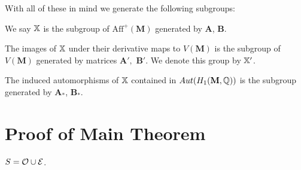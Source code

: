 \documentclass[]{article}
\def\bM{\mathbf{M}}
\begin{document}
With all of these in mind we generate the following subgroups:

\begin{Def}
We say $\mathbb{X}$ is the subgroup of $\text{Aff}^+(\bM)$ generated by $\mathbf{A}$, $\mathbf{B}$.
\end{Def}

\begin{Def}
The images of $\mathbb{X}$ under their derivative maps to $V(\bM)$ is the subgroup of $V(\bM)$ generated by matrices $\mathbf{A}',$ $\mathbf{B}'$. We denote this group by $\mathbb{X}'$.
\end{Def}

\begin{Def}
The induced automorphisms of $\mathbb{X}$ contained in $Aut(H_1(\bM,\QQ))$ is the subgroup generated by $\mathbf{A}_*$, $\mathbf{B}_*$.
\end{Def}
\section{Proof of Main Theorem}

$S=\mathcal{O}\cup \mathcal{E}$.
\end{document}
